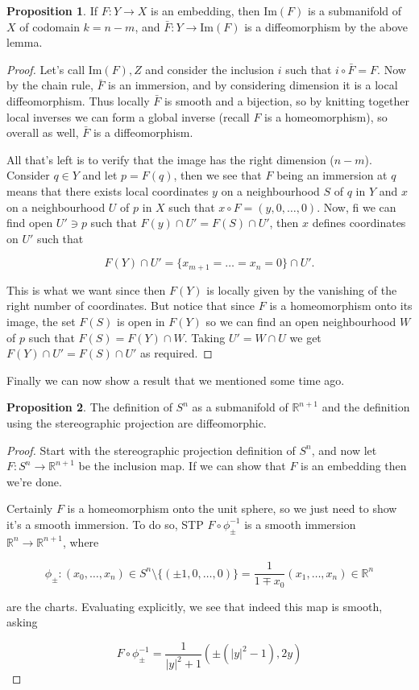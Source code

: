 \documentclass{article}
\theoremstyle{definition}
\newtheorem{proposition}{Proposition}
\begin{document}
\begin{proposition}
If $F: Y \to X$ is an embedding, then $\text{Im}(F)$ is a submanifold of $X$ of
codomain $k = n - m$, and $\bar{F} : Y \to \text{Im}(F)$ is a diffeomorphism by
the above lemma.
\end{proposition}

\begin{proof}
Let's call $\text{Im}(F), Z$ and consider the inclusion $i$ such that $i \circ
\bar{F} = F$. Now by the chain rule, $\bar{F}$ is an immersion, and by
considering dimension it is a local diffeomorphism. Thus locally $\bar{F}$ is
smooth and a bijection, so by knitting together local inverses we can form a
global inverse (recall $F$ is a homeomorphism), so overall as well, $\bar{F}$ is
a diffeomorphism.

All that's left is to verify that the image has the right dimension ($n - m$). Consider $q
\in Y$ and let $p = F(q)$, then we see that $F$ being an immersion at $q$ means
that there exists local coordinates $y$ on a neighbourhood $S$ of $q$ in $Y$ and
$x$ on a neighbourhood $U$ of $p$ in $X$ such that $x \circ F = (y, 0, \dots,
0)$. Now, fi we can find open $U' \ni p$ such that $F(y) \cap U' = F(S) \cap
U'$, then $x$ defines coordinates on $U'$ such that

$$ F(Y) \cap U' = \{x_{m + 1} = \dots = x_n = 0\} \cap U'. $$

This is what we want since then $F(Y)$ is locally given by the vanishing of the
right number of coordinates. But notice that since $F$ is a homeomorphism onto
its image, the set $F(S)$ is open in $F(Y)$ so we can find an open neighbourhood
$W$ of $p$ such that $F(S) = F(Y) \cap W$. Taking $U' = W \cap U$ we get $F(Y)
\cap U' = F(S) \cap U'$ as required.
\end{proof}

Finally we can now show a result that we mentioned some time ago.

\begin{proposition}
The definition of $S^n$ as a submanifold of $\mathbb{R}^{n + 1}$ and the
definition using the stereographic projection are diffeomorphic.
\end{proposition}
\begin{proof}
Start with the stereographic projection definition of $S^n$, and now let $F :
S^n \to \mathbb{R}^{n + 1}$ be the inclusion map. If we can show that $F$ is an
embedding then we're done.

Certainly $F$ is a homeomorphism onto the unit sphere, so we just need to show
it's a smooth immersion. To do so, STP $F \circ \phi_{\pm}^{-1}$ is a smooth
immersion $\mathbb{R}^n \to \mathbb{R}^{n + 1}$, where 

$$ \phi_\pm : (x_0, \dots, x_n) \in S^n \setminus \{(\pm 1, 0, \dots, 0)\} =
\frac{1}{1 \mp x_0} (x_1, \dots, x_n) \in \mathbb{R}^n $$

are the charts. Evaluating explicitly, we see that indeed this map is smooth,
asking

$$ F \circ \phi_\pm^{-1} = \frac{1}{|y|^2 + 1} (\pm (|y|^2 - 1), 2y) $$
\end{proof}
\end{document}
